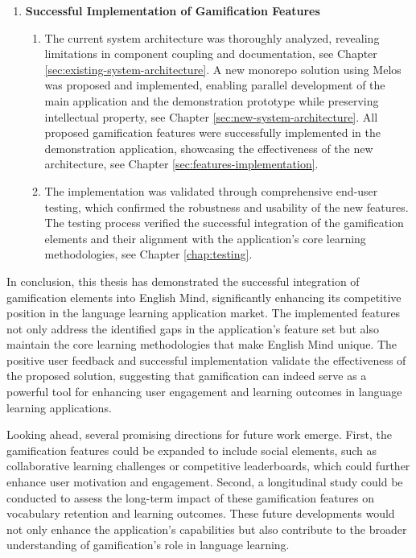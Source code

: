 \begin{enumerate}
    \item \textbf{Successful Implementation of Gamification Features}
    \begin{enumerate}
        \item The current system architecture was thoroughly analyzed, revealing limitations in component coupling and documentation, see Chapter \ref{sec:existing-system-architecture}. A new monorepo solution using Melos was proposed and implemented, enabling parallel development of the main application and the demonstration prototype while preserving intellectual property, see Chapter \ref{sec:new-system-architecture}. All proposed gamification features were successfully implemented in the demonstration application, showcasing the effectiveness of the new architecture, see Chapter \ref{sec:features-implementation}.

        \item The implementation was validated through comprehensive end-user testing, which confirmed the robustness and usability of the new features. The testing process verified the successful integration of the gamification elements and their alignment with the application's core learning methodologies, see Chapter \ref{chap:testing}.
    \end{enumerate}
\end{enumerate}

In conclusion, this thesis has demonstrated the successful integration of gamification elements into English Mind, significantly enhancing its competitive position in the language learning application market. The implemented features not only address the identified gaps in the application's feature set but also maintain the core learning methodologies that make English Mind unique. The positive user feedback and successful implementation validate the effectiveness of the proposed solution, suggesting that gamification can indeed serve as a powerful tool for enhancing user engagement and learning outcomes in language learning applications.

Looking ahead, several promising directions for future work emerge. First, the gamification features could be expanded to include social elements, such as collaborative learning challenges or competitive leaderboards, which could further enhance user motivation and engagement. Second, a longitudinal study could be conducted to assess the long-term impact of these gamification features on vocabulary retention and learning outcomes. These future developments would not only enhance the application's capabilities but also contribute to the broader understanding of gamification's role in language learning.
